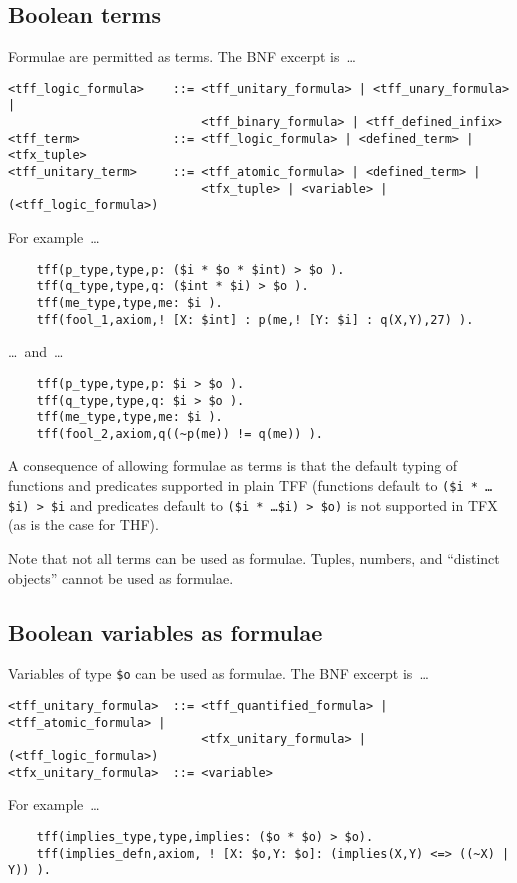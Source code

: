 \documentclass{easychair}
\begin{document}
\subsection{Boolean terms}

Formulae are permitted as terms. 
The BNF excerpt is~\ldots
\begin{verbatim}
<tff_logic_formula>    ::= <tff_unitary_formula> | <tff_unary_formula> |
                           <tff_binary_formula> | <tff_defined_infix>
<tff_term>             ::= <tff_logic_formula> | <defined_term> | <tfx_tuple>
<tff_unitary_term>     ::= <tff_atomic_formula> | <defined_term> |
                           <tfx_tuple> | <variable> | (<tff_logic_formula>)
\end{verbatim}
For example~\ldots
\begin{verbatim}
    tff(p_type,type,p: ($i * $o * $int) > $o ).
    tff(q_type,type,q: ($int * $i) > $o ).
    tff(me_type,type,me: $i ).
    tff(fool_1,axiom,! [X: $int] : p(me,! [Y: $i] : q(X,Y),27) ).
\end{verbatim}
\ldots~and~\ldots
\begin{verbatim}
    tff(p_type,type,p: $i > $o ).
    tff(q_type,type,q: $i > $o ).
    tff(me_type,type,me: $i ).
    tff(fool_2,axiom,q((~p(me)) != q(me)) ).
\end{verbatim}
A consequence of allowing formulae as terms is that the default typing of 
functions and predicates supported in plain TFF (functions default to 
{\tt (\$i * \ldots * \$i) > \$i} and predicates default to 
{\tt (\$i * \ldots * \$i) > \$o)} is not supported in TFX (as is the case 
for THF).

Note that not all terms can be used as formulae.
Tuples, numbers, and ``distinct objects'' cannot be used as formulae.

\subsection{Boolean variables as formulae}

Variables of type {\tt \$o} can be used as formulae. 
The BNF excerpt is~\ldots
\begin{verbatim}
<tff_unitary_formula>  ::= <tff_quantified_formula> | <tff_atomic_formula> |
                           <tfx_unitary_formula> | (<tff_logic_formula>)
<tfx_unitary_formula>  ::= <variable>
\end{verbatim}
For example~\ldots
\begin{verbatim}
    tff(implies_type,type,implies: ($o * $o) > $o).
    tff(implies_defn,axiom, ! [X: $o,Y: $o]: (implies(X,Y) <=> ((~X) | Y)) ).
\end{verbatim}
\end{document}
